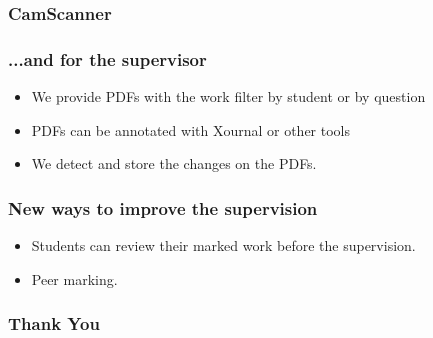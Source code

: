 \documentclass{beamer}
\begin{document}
    {
      \begin{frame}[plain]
        \frametitle{CamScanner}
      \end{frame}
    }
    \begin{frame}
    	\frametitle{...and for the supervisor}
    	\begin{itemize}
    		\item We provide PDFs with the work filter by student or by question
    		\item PDFs can be annotated with Xournal or other tools
    		\item We detect and store the changes on the PDFs.
    	\end{itemize}
    \end{frame}
    
    \begin{frame}
    	\frametitle{New ways to improve the supervision}
    	\begin{itemize}
    		\item Students can review their marked work before the supervision.
    		\item Peer marking.
    	\end{itemize}
    \end{frame}
    \begin{frame}
    	\frametitle{Thank You}
    \end{frame}
\end{document}
